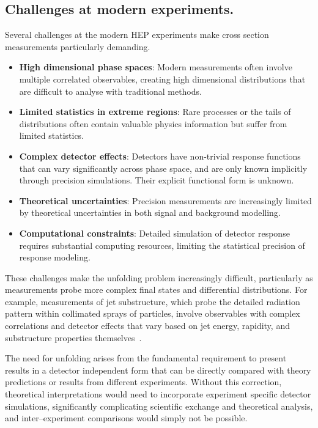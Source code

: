 \begin{definition}
\section{Challenges at modern experiments.}
    Several challenges at the modern HEP experiments make cross section measurements particularly demanding.

    \begin{itemize}
        \item \textbf{High dimensional phase spaces}: Modern measurements often involve multiple correlated observables, creating high dimensional distributions that are difficult to analyse with traditional methods.
        \item \textbf{Limited statistics in extreme regions}: Rare processes or the tails of distributions often contain valuable physics information but suffer from limited statistics.
        \item \textbf{Complex detector effects}: Detectors have non-trivial response functions that can vary significantly across phase space, and are only known implicitly through precision simulations. Their explicit functional form is unknown.
        \item \textbf{Theoretical uncertainties}: Precision measurements are increasingly limited by theoretical uncertainties in both signal and background modelling.
        \item \textbf{Computational constraints}: Detailed simulation of detector response requires substantial computing resources, limiting the statistical precision of response modeling.
    \end{itemize}

    These challenges make the unfolding problem increasingly difficult, particularly as measurements probe more complex final states and differential distributions.
    For example, measurements of jet substructure, which probe the detailed radiation pattern within collimated sprays of particles, involve observables with complex correlations and detector effects that vary based on jet energy, rapidity, and substructure properties themselves~\cite{Larkoski2020JetLearning, kogler_jet_2019, mozer_jet_2017}.
    
    The need for unfolding arises from the fundamental requirement to present results in a detector independent form that can be directly compared with theory predictions or results from different experiments.
    Without this correction, theoretical interpretations would need to incorporate experiment specific detector simulations, significantly complicating scientific exchange and theoretical analysis, and inter--experiment comparisons would simply not be possible.


\end{definition}
